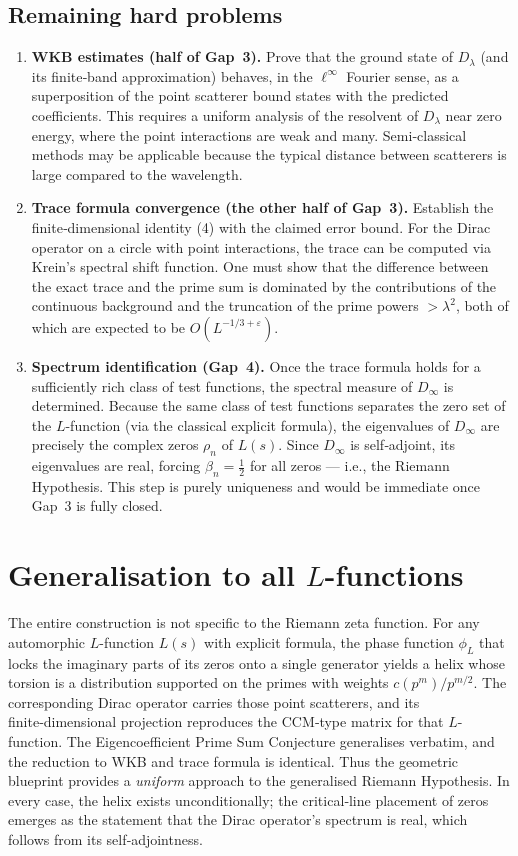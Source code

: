\documentclass[12pt,a4paper]{article}
\begin{document}
\subsection*{Remaining hard problems}
\begin{enumerate}[label=Gap \arabic*:,leftmargin=*]
\item \textbf{WKB estimates (half of Gap~3).} Prove that the ground state of $D_\lambda$ (and its finite‑band approximation) behaves, in the $\ell^\infty$ Fourier sense, as a superposition of the point scatterer bound states with the predicted coefficients.  This requires a uniform analysis of the resolvent of $D_\lambda$ near zero energy, where the point interactions are weak and many.  Semi‑classical methods may be applicable because the typical distance between scatterers is large compared to the wavelength.
\item \textbf{Trace formula convergence (the other half of Gap~3).} Establish the finite‑dimensional identity (4) with the claimed error bound.  For the Dirac operator on a circle with point interactions, the trace can be computed via Krein's spectral shift function.  One must show that the difference between the exact trace and the prime sum is dominated by the contributions of the continuous background and the truncation of the prime powers $>\lambda^2$, both of which are expected to be $O(L^{-1/3+\varepsilon})$.
\item \textbf{Spectrum identification (Gap~4).} Once the trace formula holds for a sufficiently rich class of test functions, the spectral measure of $D_\infty$ is determined.  Because the same class of test functions separates the zero set of the $L$-function (via the classical explicit formula), the eigenvalues of $D_\infty$ are precisely the complex zeros $\rho_n$ of $L(s)$.  Since $D_\infty$ is self‑adjoint, its eigenvalues are real, forcing $\beta_n = \frac12$ for all zeros --- i.e., the Riemann Hypothesis.  This step is purely uniqueness and would be immediate once Gap~3 is fully closed.
\end{enumerate}

\section{Generalisation to all $L$-functions}
The entire construction is not specific to the Riemann zeta function.  For any automorphic $L$-function $L(s)$ with explicit formula, the phase function $\phi_L$ that locks the imaginary parts of its zeros onto a single generator yields a helix whose torsion is a distribution supported on the primes with weights $c(p^m)/p^{m/2}$.  The corresponding Dirac operator carries those point scatterers, and its finite‑dimensional projection reproduces the CCM‑type matrix for that $L$-function.  The Eigencoefficient Prime Sum Conjecture generalises verbatim, and the reduction to WKB and trace formula is identical.  Thus the geometric blueprint provides a \emph{uniform} approach to the generalised Riemann Hypothesis.  In every case, the helix exists unconditionally; the critical‑line placement of zeros emerges as the statement that the Dirac operator's spectrum is real, which follows from its self‑adjointness.
\end{document}
